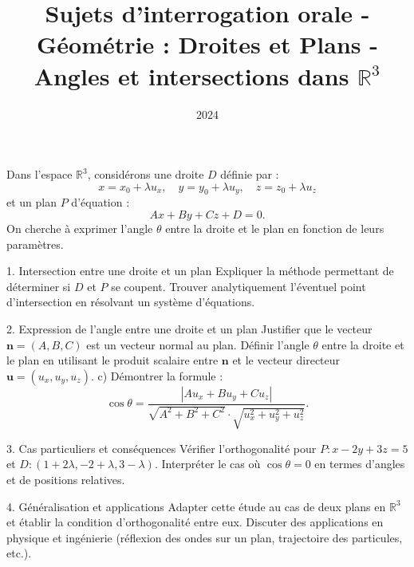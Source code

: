 \documentclass[10pt,a4paper]{article}
\title{Sujets d'interrogation orale - Géométrie : Droites et Plans - Angles et intersections dans $\mathbb{R}^3$}
\author{}
\date{2024}
\begin{document}
\maketitle

Dans l'espace $\mathbb{R}^3$, considérons une droite $D$ définie par :
$$
x = x_0 + \lambda u_x, \quad y = y_0 + \lambda u_y, \quad z = z_0 + \lambda u_z
$$
et un plan $P$ d'équation :
$$
Ax + By + Cz + D = 0.
$$
On cherche à exprimer l'angle $\theta$ entre la droite et le plan en fonction de leurs paramètres.

1. Intersection entre une droite et un plan
  \ql Expliquer la méthode permettant de déterminer si $D$ et $P$ se coupent.
  \ql Trouver analytiquement l'éventuel point d'intersection en résolvant un système d'équations.

2. Expression de l'angle entre une droite et un plan
  \ql Justifier que le vecteur $\mathbf{n} = (A,B,C)$ est un vecteur normal au plan.
  \ql Définir l'angle $\theta$ entre la droite et le plan en utilisant le produit scalaire entre $\mathbf{n}$ et le vecteur directeur $\mathbf{u} = (u_x, u_y, u_z)$.
   c) Démontrer la formule :
   $$
   \cos \theta = \frac{|A u_x + B u_y + C u_z|}{\sqrt{A^2 + B^2 + C^2} \cdot \sqrt{u_x^2 + u_y^2 + u_z^2}}.
   $$

3. Cas particuliers et conséquences
  \ql Vérifier l'orthogonalité pour $P : x - 2y + 3z = 5$ et $D : (1+2\lambda, -2+\lambda, 3-\lambda)$.
  \ql Interpréter le cas où $\cos \theta = 0$ en termes d'angles et de positions relatives.

4. Généralisation et applications
  \ql Adapter cette étude au cas de deux plans en $\mathbb{R}^3$ et établir la condition d'orthogonalité entre eux.
  \ql Discuter des applications en physique et ingénierie (réflexion des ondes sur un plan, trajectoire des particules, etc.).
\end{document}
